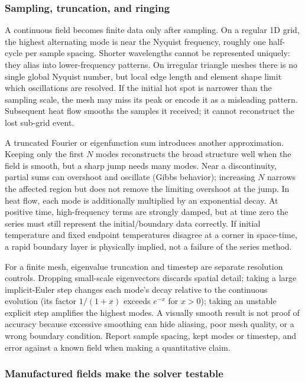 \subsubsection{Sampling, truncation, and ringing}\label{02-foundations-ii-ch025-sampling-truncation-and-ringing}

A continuous field becomes finite data only after sampling. On a regular 1D grid, the highest alternating mode is near the Nyquist frequency, roughly one half-cycle per sample spacing. Shorter wavelengths cannot be represented uniquely: they alias into lower-frequency patterns. On irregular triangle meshes there is no single global Nyquist number, but local edge length and element shape limit which oscillations are resolved. If the initial hot spot is narrower than the sampling scale, the mesh may miss its peak or encode it as a misleading pattern. Subsequent heat flow smooths the samples it received; it cannot reconstruct the lost sub-grid event.

A truncated Fourier or eigenfunction sum introduces another approximation. Keeping only the first \(N\) modes reconstructs the broad structure well when the field is smooth, but a sharp jump needs many modes. Near a discontinuity, partial sums can overshoot and oscillate (Gibbs behavior); increasing \(N\) narrows the affected region but does not remove the limiting overshoot at the jump. In heat flow, each mode is additionally multiplied by an exponential decay. At positive time, high-frequency terms are strongly damped, but at time zero the series must still represent the initial/boundary data correctly. If initial temperature and fixed endpoint temperatures disagree at a corner in space-time, a rapid boundary layer is physically implied, not a failure of the series method.

For a finite mesh, eigenvalue truncation and timestep are separate resolution controls. Dropping small-scale eigenvectors discards spatial detail; taking a large implicit-Euler step changes each mode's decay relative to the continuous evolution (its factor \(1/(1+x)\) exceeds \(e^{-x}\) for \(x>0\)); taking an unstable explicit step amplifies the highest modes. A visually smooth result is not proof of accuracy because excessive smoothing can hide aliasing, poor mesh quality, or a wrong boundary condition. Report sample spacing, kept modes or timestep, and error against a known field when making a quantitative claim.

\subsubsection{Manufactured fields make the solver testable}\label{02-foundations-ii-ch025-manufactured-fields-make-the-solver-testable}

